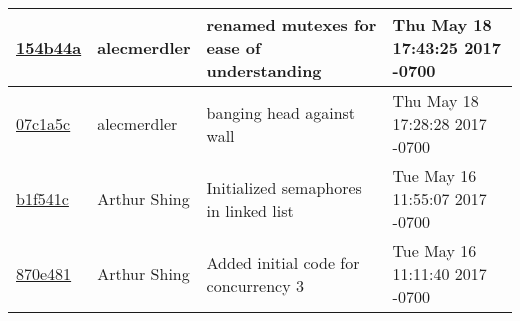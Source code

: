 \begin{tabular}{l l l l}
\href{https://github.com/alecmerdler/cs-444-group-119/commit/154b44ad7641fb70692d934a20edefc35e591095}{154b44a} & alecmerdler & renamed mutexes for ease of understanding & Thu May 18 17:43:25 2017 -0700\\\hline
\href{https://github.com/alecmerdler/cs-444-group-119/commit/07c1a5c4eeba4ce006bc02f34db8649bc7183be0}{07c1a5c} & alecmerdler & banging head against wall & Thu May 18 17:28:28 2017 -0700\\\hline
\href{https://github.com/alecmerdler/cs-444-group-119/commit/b1f541cd8f4d8edba89a3dff184530fea1886a86}{b1f541c} & Arthur Shing & Initialized semaphores in linked list & Tue May 16 11:55:07 2017 -0700\\\hline
\href{https://github.com/alecmerdler/cs-444-group-119/commit/870e481b8ef72036c364cae34427d16f1695d68a}{870e481} & Arthur Shing & Added initial code for concurrency 3 & Tue May 16 11:11:40 2017 -0700\\\hline\end{tabular}
